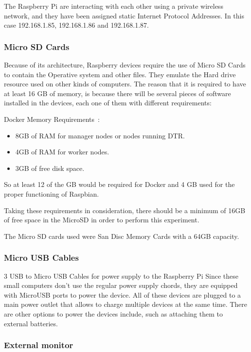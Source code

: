 The Raspberry Pi are interacting with each other using a private
wireless network, and they have been assigned static Internet
Protocol Addresses. In this case 192.168.1.85, 192.168.1.86 and
192.168.1.87.
	
	
\subsubsection{Micro SD Cards}
	
Because of its architecture, Raspberry devices require the use of
Micro SD Cards to contain the Operative system and other files. They
emulate the Hard drive resource used on other kinds of computers.  The
reason that it is required to have at least 16 GB of memory, is
because there will be several pieces of software installed in the
devices, each one of them with different requirements:
	
Docker Memory Requirements~\cite{dockerdoc2017}:

\begin{itemize}
	\item 8GB of RAM for manager nodes or nodes running DTR.
	\item 4GB of RAM for worker nodes.
	\item 3GB of free disk space.
\end{itemize}
	
So at least 12 of the GB would be required for Docker and 4 GB used
for the proper functioning of Raspbian.~\cite{rpicards2017}
	
Taking these requirements in consideration, there should be a minimum
of 16GB of free space in the MicroSD in order to perform this
experiment.
	
The Micro SD cards used were San Disc Memory Cards with a 64GB capacity.
	
\subsubsection{Micro USB Cables}
	
3 USB to Micro USB Cables for power supply to the Raspberry Pi Since
these small computers don’t use the regular power supply chords, they
are equipped with MicroUSB ports to power the device.  All of these
devices are plugged to a main power outlet that allows to charge
multiple devices at the same time.  There are other options to power
the devices include, such as attaching them to external batteries.
	
\subsubsection{External monitor}
	
